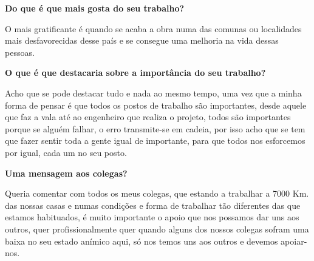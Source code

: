 {\bf Do que é que mais gosta do seu trabalho?}

\vspace{10pt}

O mais gratificante é quando se acaba a obra numa das comunas ou
localidades mais desfavorecidas desse país e se consegue uma melhoria
na vida dessas pessoas.

\vspace{20pt}

{\bf O que é que destacaria sobre a importância do seu trabalho?}

\vspace{10pt}

Acho que se pode destacar tudo e nada ao mesmo tempo, uma vez que a
minha forma de pensar é que todos os postos de trabalho são
importantes, desde aquele que faz a vala até ao engenheiro que realiza
o projeto, todos são importantes porque se alguém falhar, o erro
transmite-se em cadeia, por isso acho que se tem que fazer sentir toda
a gente igual de importante, para que todos nos esforcemos por igual,
cada um no seu posto.

\vspace{20pt}

{\bf Uma mensagem aos colegas?}

\vspace{10pt}

Queria comentar com todos os meus colegas, que estando a trabalhar a
7000 Km. das nossas casas e numas condições e forma de trabalhar tão
diferentes das que estamos habituados, é muito importante o apoio que
nos possamos dar uns aos outros, quer profissionalmente quer quando
alguns dos nossos colegas sofram uma baixa no seu estado anímico aqui,
só nos temos uns aos outros e devemos apoiar-nos.


\newpage




